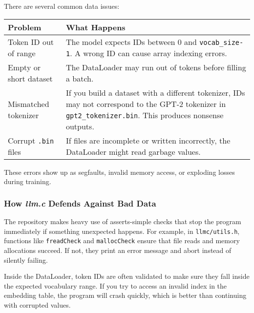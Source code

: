 \documentclass[
  letterpaper,
  DIV=11,
  numbers=noendperiod]{scrreprt}
\begin{document}
There are several common data issues:

\begin{longtable}[]{@{}
  >{\raggedright\arraybackslash}p{}
  >{\raggedright\arraybackslash}p{}@{}}
\toprule\noalign{}
\begin{minipage}[b]{\linewidth}\raggedright
Problem
\end{minipage} & \begin{minipage}[b]{\linewidth}\raggedright
What Happens
\end{minipage} \\
\midrule\noalign{}
\endhead
\bottomrule\noalign{}
\endlastfoot
Token ID out of range & The model expects IDs between 0 and
\texttt{vocab\_size-1}. A wrong ID can cause array indexing errors. \\
Empty or short dataset & The DataLoader may run out of tokens before
filling a batch. \\
Mismatched tokenizer & If you build a dataset with a different
tokenizer, IDs may not correspond to the GPT-2 tokenizer in
\texttt{gpt2\_tokenizer.bin}. This produces nonsense outputs. \\
Corrupt \texttt{.bin} files & If files are incomplete or written
incorrectly, the DataLoader might read garbage values. \\
\end{longtable}

These errors show up as segfaults, invalid memory access, or exploding
losses during training.

\subsubsection{\texorpdfstring{How \emph{llm.c} Defends Against Bad
Data}{How llm.c Defends Against Bad Data}}\label{how-llm.c-defends-against-bad-data}

The repository makes heavy use of asserts-simple checks that stop the
program immediately if something unexpected happens. For example, in
\texttt{llmc/utils.h}, functions like \texttt{freadCheck} and
\texttt{mallocCheck} ensure that file reads and memory allocations
succeed. If not, they print an error message and abort instead of
silently failing.

Inside the DataLoader, token IDs are often validated to make sure they
fall inside the expected vocabulary range. If you try to access an
invalid index in the embedding table, the program will crash quickly,
which is better than continuing with corrupted values.
\end{document}
